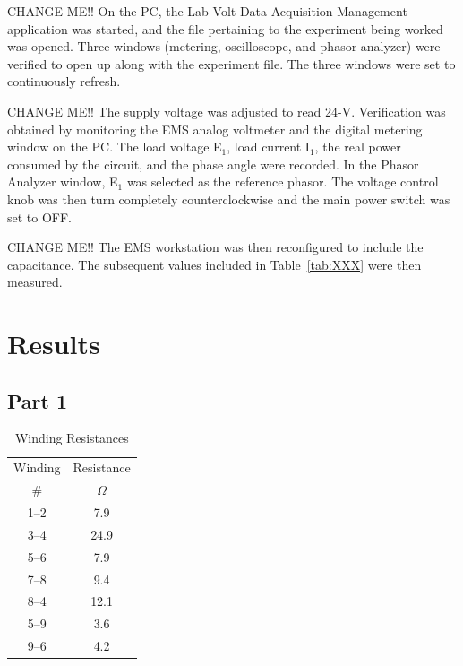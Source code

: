 \documentclass{article}
\begin{document}
CHANGE ME!! On the PC, the Lab-Volt Data Acquisition Management application was
started, and the file pertaining to the experiment being worked was opened.
Three windows (metering, oscilloscope, and phasor analyzer) were verified to
open up along with the experiment file. The three windows were set to
continuously refresh.

CHANGE ME!! The supply voltage was adjusted to read 24-V. Verification was
obtained by monitoring the EMS analog voltmeter and the digital metering window
on the {PC}.  The load voltage E$_1$, load current I$_1$, the real power
consumed by the circuit, and the phase angle were recorded. In the Phasor
Analyzer window, E$_1$ was selected as the reference phasor. The voltage
control knob was then turn completely counterclockwise and the main power
switch was set to OFF.

CHANGE ME!! The EMS workstation was then reconfigured to include the
capacitance.  The subsequent values included in Table~\ref{tab:XXX} were then
measured.

\section{Results}
\subsection{Part 1}
\begin{table}[h]
  \centering
  \begin{tabular}{cc}
    \hline
    Winding & Resistance \\
    \# & $\Omega$ \\
    \hline
    1--2 &  7.9 \\
    3--4 & 24.9 \\
    5--6 &  7.9 \\
    7--8 &  9.4 \\
    8--4 & 12.1 \\
    5--9 &  3.6 \\
    9--6 &  4.2 \\
  \end{tabular}
  \caption{Winding Resistances}
  \label{tab:wind_res}
\end{table}
\end{document}
